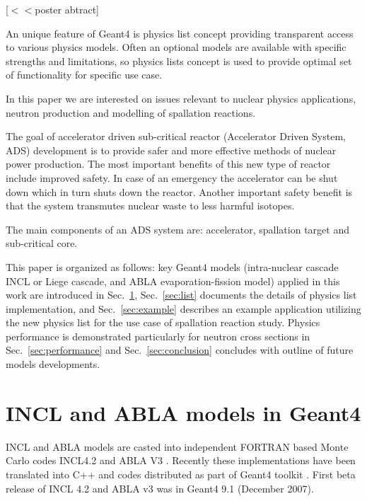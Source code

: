 \documentclass[a4paper]{jpconf}
\begin{document}
[$<<$poster abtract]


An unique feature of Geant4 is physics list concept providing transparent access 
to various physics models. 
Often an optional models are available with specific strengths and limitations, 
so physics lists concept is used to
provide optimal set of functionality for specific use case.

In this paper we are interested on issues relevant to nuclear physics applications,
neutron production and modelling of spallation reactions.  


The goal of accelerator driven sub-critical reactor (Accelerator
Driven System, ADS) development is to provide safer and more effective
methods of nuclear power production. The most important benefits of
this new type of reactor include improved safety. In case of an
emergency the accelerator can be shut down which in turn shuts down
the reactor. Another important safety benefit is that the system
transmutes nuclear waste to less harmful isotopes.

The main components of an ADS system are: accelerator, spallation
target and sub-critical core.

This paper is organized as follows:
key Geant4 models (intra-nuclear cascade INCL or Liege cascade, and ABLA evaporation-fission model) 
applied in this work are introduced in Sec.~\ref{sec:models},
Sec.~\ref{sec:list} documents the details of physics list implementation, and
Sec.~\ref{sec:example} describes an example application utilizing the new physics list
for the use case of spallation reaction study.
Physics performance is demonstrated particularly for 
neutron  cross sections in Sec.~\ref{sec:performance} and
Sec.~\ref{sec:conclusion} concludes with outline of future models developments.


\section{INCL and ABLA models in Geant4} \label{sec:models}

INCL and ABLA models are casted into independent FORTRAN based Monte Carlo codes 
INCL4.2 and ABLA V3 \cite{heikkinen07mProceedings}.
Recently these implementations have been translated into C++ and codes distributed
as part of Geant4 toolkit \cite{heikkinen03aPaper}. 
First beta release of INCL 4.2 and ABLA v3 was in Geant4  9.1 (December 2007).
\end{document}
